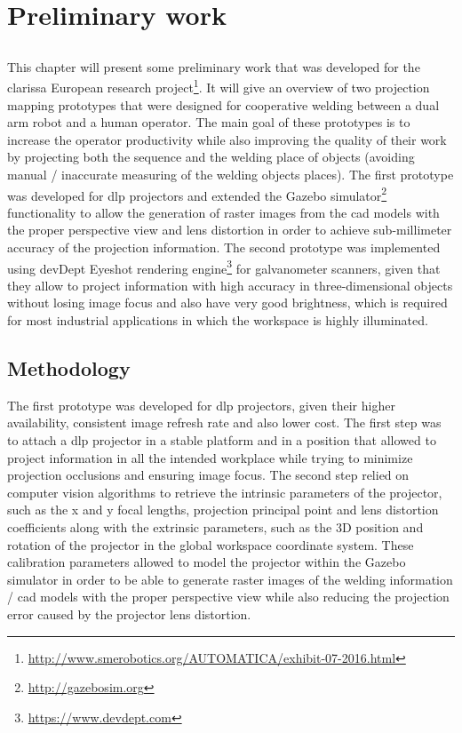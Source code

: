\chapter{Preliminary work}\label{chap:preliminary-work}

\section*{}

This chapter will present some preliminary work that was developed for the \gls{clarissa} European research project\footnote{\url{http://www.smerobotics.org/AUTOMATICA/exhibit-07-2016.html}}. It will give an overview of two projection mapping prototypes that were designed for cooperative welding between a dual arm robot and a human operator. The main goal of these prototypes is to increase the operator productivity while also improving the quality of their work by projecting both the sequence and the welding place of objects (avoiding manual / inaccurate measuring of the welding objects places). The first prototype was developed for \gls{dlp} projectors and extended the Gazebo simulator\footnote{\url{http://gazebosim.org}} functionality to allow the generation of raster images from the \gls{cad} models with the proper perspective view and lens distortion in order to achieve sub-millimeter accuracy of the projection information. The second prototype was implemented using devDept Eyeshot rendering engine\footnote{\url{https://www.devdept.com}} for galvanometer scanners, given that they allow to project information with high accuracy in three-dimensional objects without losing image focus and also have very good brightness, which is required for most industrial applications in which the workspace is highly illuminated.


\section{Methodology}

The first prototype was developed for \gls{dlp} projectors, given their higher availability, consistent image refresh rate and also lower cost. The first step was to attach a \gls{dlp} projector in a stable platform and in a position that allowed to project information in all the intended workplace while trying to minimize projection occlusions and ensuring image focus. The second step relied on computer vision algorithms to retrieve the intrinsic parameters of the projector, such as the x and y focal lengths, projection principal point and lens distortion coefficients along with the extrinsic parameters, such as the 3D position and rotation of the projector in the global workspace coordinate system. These calibration parameters allowed to model the projector within the Gazebo simulator in order to be able to generate raster images of the welding information / \gls{cad} models with the proper perspective view while also reducing the projection error caused by the projector lens distortion.

